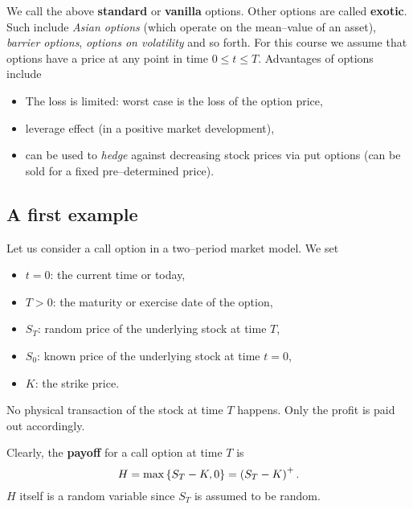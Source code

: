 \documentclass[12pt]{amsart}
\begin{document}
We call the above \textbf{standard} or \textbf{vanilla} options. Other options are called \textbf{exotic}. Such include \emph{Asian options} (which operate on the mean--value of an asset), \emph{barrier options}, \emph{options on volatility} and so forth. For this course we assume that options have a price at any point in time \(0 \leq t \leq T\). Advantages of options include
\begin{itemize}
    \item The loss is limited: worst case is the loss of the option price,
    \item leverage effect (in a positive market development),
    \item can be used to \emph{hedge} against decreasing stock prices via put options (can be sold for a fixed pre--determined price).
\end{itemize}

\subsection{A first example}

Let us consider a call option in a two--period market model. We set
\begin{itemize}
    \item \(t=0\): the current time or today,
    \item \(T>0\): the maturity or exercise date of the option,
    \item \(S_T\): random price of the underlying stock at time \(T\),
    \item \(S_0\): known price of the underlying stock at time \(t=0\),
    \item \(K\): the strike price.
\end{itemize}

\begin{remark}
    No physical transaction of the stock at time \(T\) happens. Only the profit is paid out accordingly.
\end{remark}
Clearly, the \textbf{payoff} for a call option at time \(T\) is \[
    H = \max \left\{ S_T-K, 0 \right\} = \left(S_T-K\right)^+.
\]
\(H\) itself is a random variable since \(S_T\) is assumed to be random.
\end{document}
